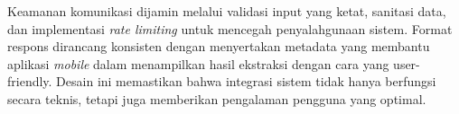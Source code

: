 Keamanan komunikasi dijamin melalui validasi input yang ketat, sanitasi data, dan implementasi \textit{rate limiting} untuk mencegah penyalahgunaan sistem. Format respons dirancang konsisten dengan menyertakan metadata yang membantu aplikasi \textit{mobile} dalam menampilkan hasil ekstraksi dengan cara yang user-friendly. Desain ini memastikan bahwa integrasi sistem tidak hanya berfungsi secara teknis, tetapi juga memberikan pengalaman pengguna yang optimal.
